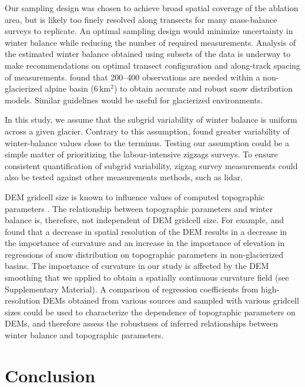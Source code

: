 \documentclass[review,oneside, letterpaper]{igs}
\begin{document}
Our sampling design was chosen to achieve broad spatial coverage of the ablation area, but is likely too finely resolved along transects for many mass-balance surveys to replicate. An optimal sampling design would minimize uncertainty in winter balance while reducing the number of required measurements. Analysis of the estimated winter balance obtained using subsets of the data is underway to make recommendations on optimal transect configuration and along-track spacing of measurements. \cite{Lopez2010} found that 200--400 observations are needed within a non-glacierized alpine basin (6\,km$^2$) to obtain accurate and robust snow distribution models. Similar guidelines would be useful for glacierized environments.

In this study, we assume that the subgrid variability of winter balance is uniform across a given glacier. Contrary to this assumption, \cite{McGrath2015} found greater variability of winter-balance values close to the terminus. Testing our assumption could be a simple matter of prioritizing the labour-intensive zigzags surveys. To ensure consistent quantification of subgrid variability, zigzag survey measurements could also be tested against other measurements methods, such as lidar. 

DEM gridcell size is known to influence values of computed topographic parameters \citep{Zhang1994, Garbrecht1994, Guo-an2001, Lopez2010}. The relationship between topographic parameters and winter balance is, therefore, not independent of DEM gridcell size. For example, \cite{Kienzle2004} and \cite{Lopez2010} found that a decrease in spatial resolution of the DEM results in a decrease in the importance of curvature and an increase in the importance of elevation in regressions of snow distribution on topographic parameters in non-glacierized basins. The importance of curvature in our study is affected by the DEM smoothing that we applied to obtain a spatially continuous curvature field (see Supplementary Material). A comparison of regression coefficients from high-resolution DEMs obtained from various sources and sampled with various gridcell sizes could be used to characterize the dependence of topographic parameters on DEMs, and therefore assess the robustness of inferred relationships between winter balance and topographic parameters. 


\section{Conclusion}
\end{document}

